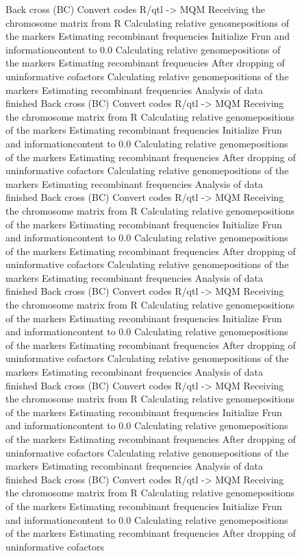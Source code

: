 \documentclass[11pt]{article}
\begin{document}
\begin{figure}[ht]
\begin{Schunk}
\begin{Soutput}
Back cross (BC)
Convert codes R/qtl -> MQM
Receiving the chromosome matrix from R
Calculating relative genomepositions of the markers
Estimating recombinant frequencies
Initialize Frun and informationcontent to 0.0
Calculating relative genomepositions of the markers
Estimating recombinant frequencies
After dropping of uninformative cofactors
Calculating relative genomepositions of the markers
Estimating recombinant frequencies
Analysis of data finished
Back cross (BC)
Convert codes R/qtl -> MQM
Receiving the chromosome matrix from R
Calculating relative genomepositions of the markers
Estimating recombinant frequencies
Initialize Frun and informationcontent to 0.0
Calculating relative genomepositions of the markers
Estimating recombinant frequencies
After dropping of uninformative cofactors
Calculating relative genomepositions of the markers
Estimating recombinant frequencies
Analysis of data finished
Back cross (BC)
Convert codes R/qtl -> MQM
Receiving the chromosome matrix from R
Calculating relative genomepositions of the markers
Estimating recombinant frequencies
Initialize Frun and informationcontent to 0.0
Calculating relative genomepositions of the markers
Estimating recombinant frequencies
After dropping of uninformative cofactors
Calculating relative genomepositions of the markers
Estimating recombinant frequencies
Analysis of data finished
Back cross (BC)
Convert codes R/qtl -> MQM
Receiving the chromosome matrix from R
Calculating relative genomepositions of the markers
Estimating recombinant frequencies
Initialize Frun and informationcontent to 0.0
Calculating relative genomepositions of the markers
Estimating recombinant frequencies
After dropping of uninformative cofactors
Calculating relative genomepositions of the markers
Estimating recombinant frequencies
Analysis of data finished
Back cross (BC)
Convert codes R/qtl -> MQM
Receiving the chromosome matrix from R
Calculating relative genomepositions of the markers
Estimating recombinant frequencies
Initialize Frun and informationcontent to 0.0
Calculating relative genomepositions of the markers
Estimating recombinant frequencies
After dropping of uninformative cofactors
Calculating relative genomepositions of the markers
Estimating recombinant frequencies
Analysis of data finished
Back cross (BC)
Convert codes R/qtl -> MQM
Receiving the chromosome matrix from R
Calculating relative genomepositions of the markers
Estimating recombinant frequencies
Initialize Frun and informationcontent to 0.0
Calculating relative genomepositions of the markers
Estimating recombinant frequencies
After dropping of uninformative cofactors

\end{Soutput}
\end{Schunk}
\end{figure}
\end{document}
